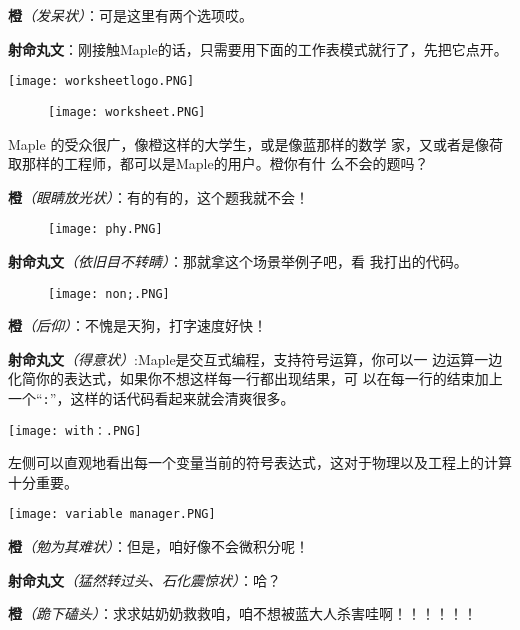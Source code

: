 \textbf{橙}\textit{（发呆状）}：可是这里有两个选项哎。

\textbf{射命丸文}：刚接触Maple的话，只需要用下面的工作表模式就行了，先把它点开。

\begin{center}
    \texttt{[image: worksheetlogo.PNG]}
\end{center}

\begin{figure}[h]
    \centering
    \texttt{[image: worksheet.PNG]}
\end{figure}

Maple 的受众很广，像橙这样的大学生，或是像蓝那样的数学 家，又或者是像荷取那样的工程师，都可以是Maple的用户。橙你有什 么不会的题吗？

\textbf{橙}\textit{（眼睛放光状）}：有的有的，这个题我就不会！
\begin{figure}[htpb]
    \centering
    \texttt{[image: phy.PNG]}
\end{figure}

\textbf{射命丸文}\textit{（依旧目不转睛）}：那就拿这个场景举例子吧，看
我打出的代码。

\begin{figure}[h]
    \centering
    \texttt{[image: non;.PNG]}
\end{figure}

\textbf{橙}\textit{（后仰）}：不愧是天狗，打字速度好快！

\textbf{射命丸文}\textit{（得意状）}:Maple是交互式编程，支持符号运算，你可以一
边运算一边化简你的表达式，如果你不想这样每一行都出现结果，可
以在每一行的结束加上一个“\verb":"”，这样的话代码看起来就会清爽很多。

\begin{center}
    \texttt{[image: with：.PNG]}
\end{center}

左侧可以直观地看出每一个变量当前的符号表达式，这对于物理以及工程上的计算十分重要。

\begin{center}
    \texttt{[image: variable manager.PNG]}
\end{center}

\textbf{橙}\textit{（勉为其难状）}：但是，咱好像不会微积分呢！

\textbf{射命丸文}\textit{（猛然转过头、石化震惊状）}：哈？

\textbf{橙}\textit{（跪下磕头）}：求求姑奶奶救救咱，咱不想被蓝大人杀害哇啊！！！！！！

